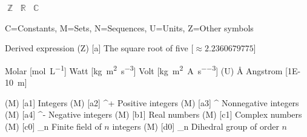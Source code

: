 
\DeclareMathOperator{\indicator} {\Bbbone}
\DeclareMathOperator{\mean} {mean}
\DeclareMathOperator{\std} {std}


\DeclareMathOperator{\sgn}{sgn}


\NewDocumentCommand \Z {} { \ensuremath{\BbbZ} }
\NewDocumentCommand \R {} { \ensuremath{\BbbR} }
\NewDocumentCommand \C {} { \ensuremath{\BbbC} }


\DeclareSIQualifier {}  %
\DeclareSIQualifier {}



\PutNomGroups
{
    C=Constants,
    M=Sets,
    N=Sequences,
    U=Units,
    Z=Other symbols
}



     {Derived expression}
\NomMath (Z) [a] {} {The square root of five} [$\approx 2.2360679775$]

 {Molar} [\unit{\mol\per\liter}]
 {Watt} [\unit{\kilogram \meter \squared \per \second \cubed}]
 {Volt} [\unit{\kilogram \meter \squared \per \ampere \per \second \cubed}]
\NomText (U) {Å} {Angstrom} [\qty{1E-10}{\meter}]

\NomMath (M) [a1] {\Z} {Integers}
\NomMath (M) [a2] {\Z^+} {Positive integers}
\NomMath (M) [a3] {\Z^{}} {Nonnegative integers}
\NomMath (M) [a4] {\Z^-} {Negative integers}
\NomMath (M) [b1] {\Z} {Real numbers}
\NomMath (M) [c1] {\C} {Complex numbers}
\NomMath (M) [c0] {\Z_n} {Finite field of $n$ integers}
\NomMath (M) [d0] {_n} {Dihedral group of order $n$}


